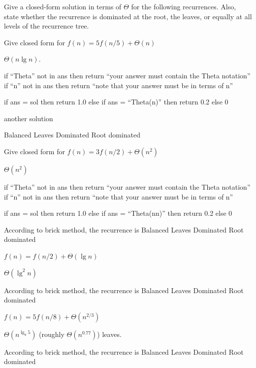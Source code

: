 \begin{problem}[40.]
Give a closed-form
solution in terms of $\Theta$ for the following recurrences.  Also, state
whether the recurrence is dominated at the root, the leaves, or
equally at all levels of the recurrence tree.


\ask[10.0]
Give closed form for  
$f(n) = 5f(n/5) + \Theta(n)$


\sol[0.5] 
$\Theta (n \lg n)$.

\algoc
if ``Theta'' not in ans then
  return ``your answer must contain the Theta notation''
if ``n'' not in ans then
  return ``note that your answer must be in terms of n''

\algog
  if ans = sol then
    return 1.0
  else if ans = ``Theta(n)'' then
    return 0.2
  else 0

\sol[1.5]
another solution

\onechoice[8.] 

\choice[1.0] Balanced
\choice[0.4] Leaves Dominated
\choice[0.6] Root dominated 



\ask[2.]
Give closed form for  
$f(n) = 3f(n/2) + \Theta(n^2)$

\sol
$\Theta(n^2)$

\algoc
if ``Theta'' not in ans then
  return ``your answer must contain the Theta notation''
if ``n'' not in ans then
  return ``note that your answer must be in terms of n''

\algog
  if ans = sol then
    return 1.0
  else if ans = ``Theta(n\lg n)'' then
    return 0.2
  else 0




\onechoice  According to brick method, the recurrence is
\choice Balanced
\choice Leaves Dominated
\choice* Root dominated

\ask[2.]
$f(n) = f(n/2) + \Theta(\lg n)$

\sol
$\Theta (\lg^2 n)$

\onechoice[10]  According to brick method, the recurrence is
\choice*[1.0] Balanced
\choice[0.2] Leaves Dominated
\choice Root dominated

\ask[2]
$f(n) = 5f(n/8) +\Theta(n^{2/3})$

\sol
$\Theta(n^{\lg_8 5})$ (roughly $\Theta(n^{0.77})$) leaves.





\onechoice  According to brick method, the recurrence is
\choice Balanced
\choice* Leaves Dominated
\choice Root dominated

\end{problem}


